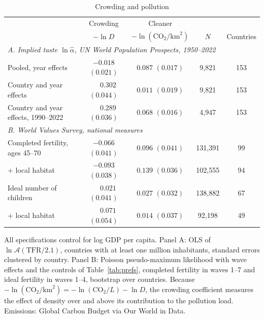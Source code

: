 \documentclass[11pt]{article}
\begin{document}
\begin{table}[h!]\centering
\begin{threeparttable}
\caption{Crowding and pollution}
\label{tab:pollution}
\footnotesize
\begin{tabular}{lcccc}
\toprule
 & Crowding & Cleaner & & \\
 & $-\ln D$ & $-\ln(\text{CO}_2/\text{km}^2)$ & $N$ & Countries\\
\midrule
\multicolumn{5}{l}{\emph{A. Implied taste $\ln\hat\alpha$, UN World Population Prospects, 1950--2022}}\\
Pooled, year effects             & $-0.018$ $(0.021)$ & $0.087$ $(0.017)$ & 9,821 & 153\\
Country and year effects         & $\phantom{-}0.302$ $(0.044)$ & $0.011$ $(0.019)$ & 9,821 & 153\\
Country and year effects, 1990--2022 & $\phantom{-}0.289$ $(0.036)$ & $0.068$ $(0.016)$ & 4,947 & 153\\
\midrule
\multicolumn{5}{l}{\emph{B. World Values Survey, national measures}}\\
Completed fertility, ages 45--70           & $-0.066$ $(0.041)$ & $0.096$ $(0.041)$ & 131,391 & 99\\
\quad + local habitat                      & $-0.093$ $(0.038)$ & $0.139$ $(0.036)$ & 102,555 & 94\\
Ideal number of children                   & $\phantom{-}0.021$ $(0.041)$ & $0.027$ $(0.032)$ & 138,882 & 67\\
\quad + local habitat                      & $\phantom{-}0.071$ $(0.054)$ & $0.014$ $(0.037)$ & 92,198 & 49\\
\bottomrule
\end{tabular}
\begin{tablenotes}\footnotesize
\item All specifications control for log GDP per capita. Panel A: OLS of $\ln\mathcal{A}(\text{TFR}/2.1)$,
countries with at least one million inhabitants, standard errors clustered by country. Panel B: Poisson
pseudo-maximum likelihood with wave effects and the controls of Table~\ref{tab:prefs}, completed
fertility in waves 1--7 and ideal fertility in waves 1--4, bootstrap over countries. Because
$-\ln(\text{CO}_2/\text{km}^2)=-\ln(\text{CO}_2/L)-\ln D$, the crowding coefficient measures the effect of
density over and above its contribution to the pollution load. Emissions: Global Carbon Budget via
Our World in Data.
\end{tablenotes}
\end{threeparttable}
\end{table}
\end{document}
